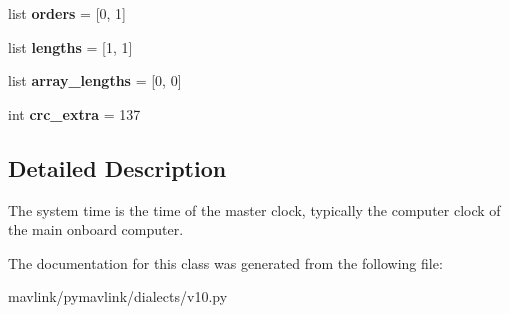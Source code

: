 \begin{DoxyCompactItemize}
\item 
\mbox{\label{classpymavlink_1_1dialects_1_1v10_1_1MAVLink__system__time__message_a65ccd6b52c13272db35830674e80a721}} 
list {\bfseries orders} = \mbox{[}0, 1\mbox{]}
\item 
\mbox{\label{classpymavlink_1_1dialects_1_1v10_1_1MAVLink__system__time__message_a1b4183755f56ece2cbe2d7e9293e1c65}} 
list {\bfseries lengths} = \mbox{[}1, 1\mbox{]}
\item 
\mbox{\label{classpymavlink_1_1dialects_1_1v10_1_1MAVLink__system__time__message_ad9ca9b6ec4a3e4a082dab6c994a2cb89}} 
list {\bfseries array\+\_\+lengths} = \mbox{[}0, 0\mbox{]}
\item 
\mbox{\label{classpymavlink_1_1dialects_1_1v10_1_1MAVLink__system__time__message_a41b2bf9f7e6f29a11c038fc835ac6ef7}} 
int {\bfseries crc\+\_\+extra} = 137
\end{DoxyCompactItemize}


\subsection{Detailed Description}
\begin{DoxyVerb}The system time is the time of the master clock, typically the
computer clock of the main onboard computer.
\end{DoxyVerb}
 

The documentation for this class was generated from the following file\+:\begin{DoxyCompactItemize}
\item 
mavlink/pymavlink/dialects/v10.\+py\end{DoxyCompactItemize}
